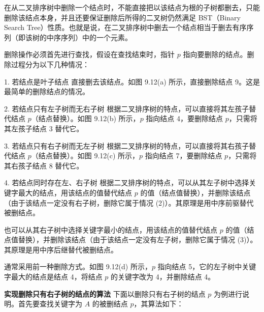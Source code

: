 \documentclass[lang=cn,newtx,10pt,scheme=chinese]{elegantbook}
\begin{document}
在从二叉排序树中删除一个结点时，不能直接把以该结点为根的子树都删去，只能删除该结点本身，并且还要保证删除后所得的二叉树仍然满足 BST（Binary Search Tree）性质。也就是说，在二叉排序树中删去一个结点相当于删去有序序列（即该树的中序序列）中的一个元素。

删除操作必须首先进行查找，假设在查找结束时，指针 $p$ 指向要删除的结点。删除过程分为以下几种情况：

1. 若结点是叶子结点  
   直接删去该结点。如图 9.12(a) 所示，直接删除结点 9。这是最简单的删除结点的情况。

2. 若结点只有左子树而无右子树  
   根据二叉排序树的特点，可以直接将其左孩子替代结点 $p$（结点替换）。如图 9.12(b) 所示，$p$ 指向结点 4，要删除结点 $p$，只需将其左孩子结点 3 替代它。

3. 若结点只有右子树而无左子树  
   根据二叉排序树的特点，可以直接将其右孩子替代结点 $p$（结点替换）。如图 9.12(c) 所示，$p$ 指向结点 7，要删除结点 $p$，只需将其右孩子结点 8 替代它。

4. 若结点同时存在左、右子树  
   根据二叉排序树的特点，可以从其左子树中选择关键字最大的结点，用该结点的值替代结点 $p$ 的值（结点值替换），并删除该结点（由于该结点一定没有右子树，删除它属于情况 (2)）。其原理是用中序前驱替代被删结点。

   也可以从其右子树中选择关键字最小的结点，用该结点的值替代结点 $p$ 的值（结点值替换），并删除该结点（由于该结点一定没有左子树，删除它属于情况 (3)）。其原理是用中序后继替代被删结点。

   通常采用前一种删除方式。如图 9.12(d) 所示，$p$ 指向结点 5，它的左子树中关键字最大的结点是结点 4，将结点 $p$ 的关键字改为 4，并删除结点 4。



\textbf{实现删除只有右子树的结点的算法}  
下面以删除只有右子树的结点 $p$ 为例进行说明。首先要查找关键字为 $A$ 的被删结点 $p$，其算法如下：
\end{document}

